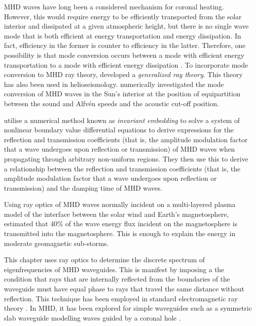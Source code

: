 	MHD waves have long been a considered mechanism for coronal heating. However, this would require energy to be efficiently transported from the solar interior and dissipated at a given atmospheric height, but there is no single wave mode that is both efficient at energy transportation and energy dissipation. In fact, efficiency in the former is counter to efficiency in the latter. Therefore, one possibility is that mode conversion occurs between a mode with efficient energy transportation to a mode with efficient energy dissipation \citep{par_etal12}. To incorporate mode conversion to MHD ray theory, \cite{shu_etal06} developed a \textit{generalized ray theory}. This theory has also been used in helioseismology. \cite{cal06} numerically investigated the mode conversion of MHD waves in the Sun's interior at the position of equipartition between the sound and Alfv\'{e}n speeds and the acoustic cut-off position.
	
	\cite{lee_etal02a} utilise a numerical method known as \textit{invariant embedding} to solve a system of nonlinear boundary value differential equations to derive expressions for the reflection and transmission coefficients (that is, the amplitude modulation factor that a wave undergoes upon reflection or transmission) of MHD waves when propagating through arbitrary non-uniform regions. They then use this to derive a relationship between the reflection and transmission coefficients (that is, the amplitude modulation factor that a wave undergoes upon reflection or transmission) and the damping time of MHD waves.
	
	Using ray optics of MHD waves normally incident on a multi-layered plasma model of the interface between the solar wind and Earth's magnetosphere, \cite{leo_etal03} estimated that 40\% of the wave energy flux incident on the magnetosphere is transmitted into the magnetosphere. This is enough to explain the energy in moderate geomagnetic sub-storms.
	
	This chapter uses ray optics to determine the discrete spectrum of eigenfrequencies of MHD waveguides. This is manifest by imposing a the condition that rays that are internally reflected from the boundaries of the waveguide must have equal phase to rays that travel the same distance without reflection. This technique has been employed in standard electromagnetic ray theory \citep{bor_etal99}. In MHD, it has been explored for simple waveguides such as a symmetric slab waveguide modelling waves guided by a coronal hole \citep{dav_85}.
	
